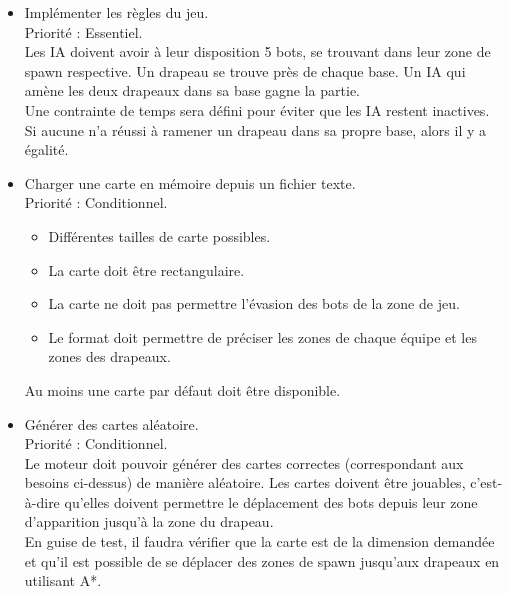 \documentclass[french]{article}
\begin{document}
    \begin{itemize}
        
        \item Implémenter les règles du jeu. \\
                Priorité : Essentiel.\\
                Les IA doivent avoir à leur disposition 5 bots, se trouvant dans leur zone de spawn respective. Un drapeau se trouve près de chaque base. Un IA qui amène les deux drapeaux dans sa base gagne la partie.\\
                Une contrainte de temps sera défini pour éviter que les IA restent inactives. Si aucune n'a réussi à ramener un drapeau dans sa propre base, alors il y a égalité.
        \item Charger une carte en mémoire depuis un fichier texte. \\
                Priorité : Conditionnel.
                \begin{itemize}
                    \item Différentes tailles de carte possibles.
                    \item La carte doit être rectangulaire.
                    \item La carte ne doit pas permettre l'évasion des bots de la zone de jeu.
                    \item Le format doit permettre de préciser les zones de chaque équipe et les zones des drapeaux.
                \end{itemize}
                Au moins une carte par défaut doit être disponible. \\
                
        \item Générer des cartes aléatoire.\\
            Priorité : Conditionnel.\\
            Le moteur doit pouvoir générer des cartes correctes (correspondant aux besoins ci-dessus) de manière aléatoire. Les cartes doivent être jouables, c'est-à-dire qu'elles doivent permettre le déplacement des bots depuis leur zone d'apparition jusqu'à la zone du drapeau.\\
            En guise de test, il faudra vérifier que la carte est de la dimension demandée et qu'il est possible de se déplacer des zones de spawn jusqu'aux drapeaux en utilisant A*.\\


\end{itemize}
\end{document}
